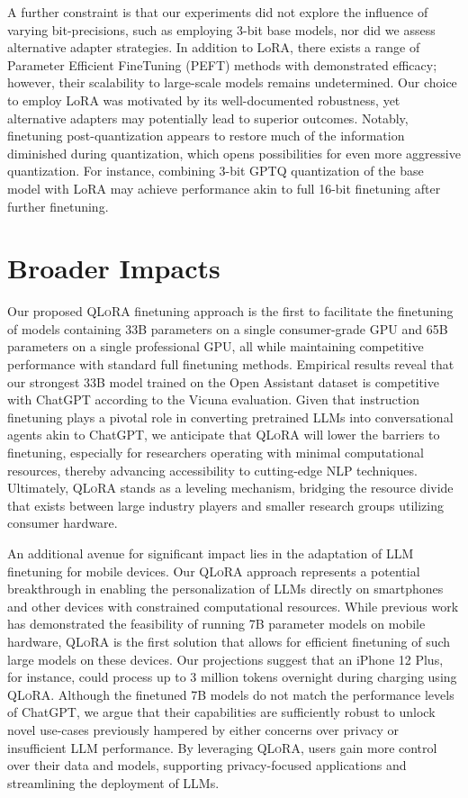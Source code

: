 A further constraint is that our experiments did not explore the influence of varying bit-precisions, such as employing 3-bit base models, nor did we assess alternative adapter strategies. In addition to LoRA, there exists a range of Parameter Efficient FineTuning (PEFT) methods with demonstrated efficacy; however, their scalability to large-scale models remains undetermined. Our choice to employ LoRA was motivated by its well-documented robustness, yet alternative adapters may potentially lead to superior outcomes. Notably, finetuning post-quantization appears to restore much of the information diminished during quantization, which opens possibilities for even more aggressive quantization. For instance, combining 3-bit GPTQ quantization of the base model with LoRA may achieve performance akin to full 16-bit finetuning after further finetuning.

\section{Broader Impacts}

Our proposed \textsc{QLoRA} finetuning approach is the first to facilitate the finetuning of models containing 33B parameters on a single consumer-grade GPU and 65B parameters on a single professional GPU, all while maintaining competitive performance with standard full finetuning methods. Empirical results reveal that our strongest 33B model trained on the Open Assistant dataset is competitive with ChatGPT according to the Vicuna evaluation. Given that instruction finetuning plays a pivotal role in converting pretrained LLMs into conversational agents akin to ChatGPT, we anticipate that \textsc{QLoRA} will lower the barriers to finetuning, especially for researchers operating with minimal computational resources, thereby advancing accessibility to cutting-edge NLP techniques. Ultimately, \textsc{QLoRA} stands as a leveling mechanism, bridging the resource divide that exists between large industry players and smaller research groups utilizing consumer hardware.

An additional avenue for significant impact lies in the adaptation of LLM finetuning for mobile devices. Our \textsc{QLoRA} approach represents a potential breakthrough in enabling the personalization of LLMs directly on smartphones and other devices with constrained computational resources. While previous work has demonstrated the feasibility of running 7B parameter models on mobile hardware, \textsc{QLoRA} is the first solution that allows for efficient finetuning of such large models on these devices. Our projections suggest that an iPhone 12 Plus, for instance, could process up to 3 million tokens overnight during charging using \textsc{QLoRA}. Although the finetuned 7B models do not match the performance levels of ChatGPT, we argue that their capabilities are sufficiently robust to unlock novel use-cases previously hampered by either concerns over privacy or insufficient LLM performance. By leveraging \textsc{QLoRA}, users gain more control over their data and models, supporting privacy-focused applications and streamlining the deployment of LLMs.

